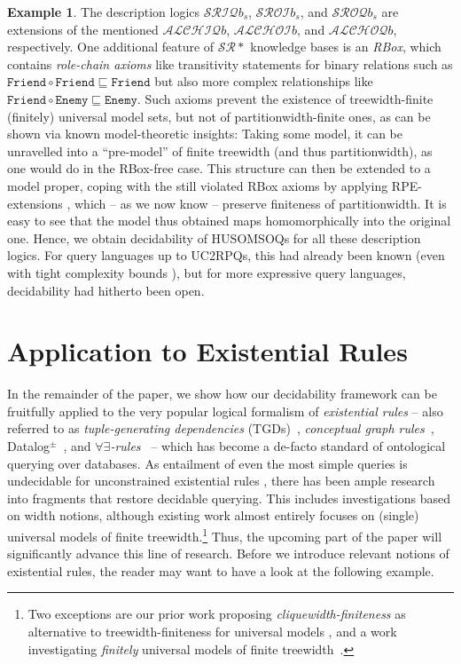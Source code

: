 \documentclass[10pt,a4paper]{amsart}
\theoremstyle{definition}
\newtheorem{exa}[exa]{Example}
\numberwithin{equation}{section}
\theoremstyle{plain}
\theoremstyle{definition}
\newtheorem{example}[example]{Example}
\theoremstyle{myexample}
\renewenvironment{example}%
{
	\begin{shaded*}	
		\vspace{-1.5ex}
		\begin{exa}%
		}{
		\end{exa}
		\vspace{-1.5ex}
	\end{shaded*}
}
\theoremstyle{plain}
\theoremstyle{definition}
\newcommand{\pred}[1]{\mathtt{#1}}
\begin{document}
\begin{example}\label{ex:srfamily}
The description logics $\mathcal{SRIQ}b_s$, $\mathcal{SROI}b_s$, and $\mathcal{SROQ}b_s$ are extensions of the mentioned $\mathcal{ALCHIQ}b$, $\mathcal{ALCHOI}b$, and $\mathcal{ALCHOQ}b$, respectively. One additional feature of $\mathcal{SR}*$ knowledge bases is an \emph{RBox}, which contains \emph{role-chain axioms} like transitivity statements for binary relations such as  $\pred{Friend}\circ\pred{Friend} \sqsubseteq \pred{Friend}$ but also more complex relationships like $\pred{Friend}\circ\pred{Enemy} \sqsubseteq \pred{Enemy}$. Such axioms prevent the existence of treewidth-finite (finitely) universal model sets, but not of partitionwidth-finite ones, as can be shown via known model-theoretic insights: Taking some model, it can be unravelled into a ``pre-model'' of finite treewidth (and thus partitionwidth), as one would do in the RBox-free case. This structure can then be extended to a model proper, coping with the still violated RBox axioms by applying RPE-extensions \cite{Kazakov08,CalvaneseEO09}, which -- as we now know -- preserve finiteness of partitionwidth. It is easy to see that the model thus obtained maps homomorphically into the original one. Hence, we obtain decidability of HUSOMSOQs for all these description logics. For query languages up to UC2RPQs, this had already been known (even with tight complexity bounds \cite{CalvaneseEO09,BednarczykR19}), but for more expressive query languages, decidability had hitherto been open.
\end{example}


\section{Application to Existential Rules}\label{sec:rules}
In the remainder of the paper, we show how our decidability framework can be fruitfully applied to the very popular logical formalism of \emph{existential rules} -- also referred to as \emph{tuple-generating dependencies} (TGDs)~\cite{AbiteboulHV95}, \emph{conceptual graph rules}~\cite{SalMug96}, Datalog$^\pm$~\cite{Gottlob09}, and \emph{$\forall \exists$-rules}~\cite{BagLecMugSal11} -- which has become a de-facto standard of ontological querying over databases. As entailment of even the most simple queries is undecidable for unconstrained existential rules \cite{ChandraLM81}, there has been ample research into fragments that restore decidable querying. This includes investigations based on width notions, although existing work almost entirely focuses on (single) universal models of finite treewidth.\footnote{Two exceptions are our prior work proposing \emph{cliquewidth-finiteness} as alternative to tree\-width-finite\-ness for universal models \cite{ICDT2023}, and a work investigating \emph{finitely} universal models of finite treewidth~\cite{BMR2023}.} Thus, the upcoming part of the paper will significantly advance this line of research. Before we introduce relevant notions of existential rules, the reader may want to have a look at the following example.
\end{document}

